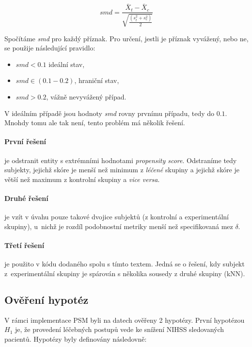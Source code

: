 \[ smd = \frac{\bar{X}_t - \bar{X}_c}{ \sqrt{\frac{(s^2_t + s^2_c)}{2} }} \]

Spočítáme \textit{smd} pro každý příznak.
Pro určení, jestli je příznak vyvážený, nebo ne, se použije následující pravidlo:

\begin{itemize}
	\item \( smd < 0.1 \) ideální stav,
	\item \( smd \in (0.1-0.2) \), hraniční stav,
	\item \( smd > 0.2 \), vážně nevyvážený případ.
\end{itemize}

V ideálním případě jsou hodnoty \textit{smd} rovny prvnímu případu, tedy do \( 0.1 \).
Mnohdy tomu ale tak není, tento problém má několik řešení.

\paragraph{První řešení}

je odstranit entity s extrémními hodnotami \textit{propensity score}.
Odstraníme tedy subjekty, jejichž skóre je menší než minimum z \textit{léčené} skupiny a jejichž skóre je větší než maximum z kontrolní skupiny a \textit{vice versa}.

\paragraph{Druhé řešení}

je vzít v úvahu pouze takové dvojice subjektů (z kontrolní a experimentální skupiny), u~nichž je rozdíl podobnostní metriky menší než specifikovaná mez \( \delta \).

\paragraph{Třetí řešení}

je použito v kódu dodaného spolu s tímto textem.
Jedná se o řešení, kdy subjekt z~experimentální skupiny je spárován s několika sousedy z druhé skupiny (kNN).

\subsection{Ověření hypotéz}

V rámci implementace PSM byli na datech ověřeny 2 hypotézy.
První hypotézou \( H_1 \) je, že provedení léčebných postupů vede ke snížení NIHSS sledovaných pacientů.
Hypotézy byly definovány následovně:

